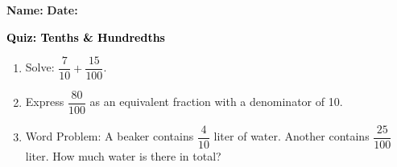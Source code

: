 \documentclass[12pt, letterpaper, fleqn]{article}
\begin{document}
\textbf{Name:} \underline{\hspace{5cm}}
\hfill
\textbf{Date:} \underline{\hspace{3cm}}\\

\begin{tcolorbox}[colback=customteal!20]
    \large\textcolor{black}{\textbf{Quiz: Tenths & Hundredths}}
\end{tcolorbox}
\begin{enumerate}[itemsep=3.5cm, leftmargin=0.6cm]
\item Solve: $\dfrac{7}{10} + \dfrac{15}{100}$.
\vspace{3.5cm}
\item Express $\dfrac{80}{100}$ as an equivalent fraction with a denominator of 10.
\vspace{3.5cm}
\item Word Problem: A beaker contains $\dfrac{4}{10}$ liter of water. Another contains $\dfrac{25}{100}$ liter. How much water is there in total?
\end{enumerate}
\end{document}
